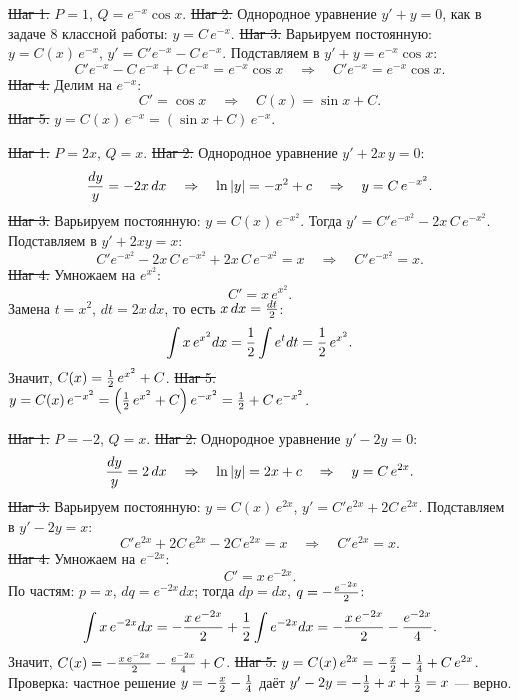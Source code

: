\st{Шаг 1.} $P=1$, $Q=e^{-x}\cos x$.
\st{Шаг 2.} Однородное уравнение $y'+y=0$, как в задаче 8 классной работы:
$y=C\,e^{-x}$.
\st{Шаг 3.} Варьируем постоянную: $y=C(x)\,e^{-x}$,
$y'=C'e^{-x}-C\,e^{-x}$. Подставляем в $y'+y=e^{-x}\cos x$:
$$C'e^{-x}-C\,e^{-x}+C\,e^{-x}=e^{-x}\cos x\quad\Rightarrow\quad
C'e^{-x}=e^{-x}\cos x.$$
\st{Шаг 4.} Делим на $e^{-x}$:
$$C'=\cos x\quad\Rightarrow\quad C(x)=\sin x+C.$$
\st{Шаг 5.} $y=C(x)\,e^{-x}=(\sin x+C)\,e^{-x}$.

\st{Шаг 1.} $P=2x$, $Q=x$.
\st{Шаг 2.} Однородное уравнение $y'+2x\,y=0$:
$${dy\over y}=-2x\,dx\quad\Rightarrow\quad\ln|y|=-x^2+c
\quad\Rightarrow\quad y=C\,e^{-x^2}.$$
\st{Шаг 3.} Варьируем постоянную: $y=C(x)\,e^{-x^2}$. Тогда
$y'=C'e^{-x^2}-2x\,C\,e^{-x^2}$. Подставляем в $y'+2xy=x$:
$$C'e^{-x^2}-2x\,C\,e^{-x^2}+2x\,C\,e^{-x^2}=x\quad\Rightarrow\quad
C'e^{-x^2}=x.$$
\st{Шаг 4.} Умножаем на $e^{x^2}$:
$$C'=x\,e^{x^2}.$$
Замена $t=x^2$, $dt=2x\,dx$, то есть $x\,dx={dt\over2}$:
$$\int x\,e^{x^2}dx={1\over2}\int e^{t}dt={1\over2}\,e^{x^2}.$$
Значит, $C(x)={1\over2}\,e^{x^2}+C$.
\st{Шаг 5.} $y=C(x)\,e^{-x^2}=\left({1\over2}\,e^{x^2}+C\right)e^{-x^2}
={1\over2}+C\,e^{-x^2}$.

\st{Шаг 1.} $P=-2$, $Q=x$.
\st{Шаг 2.} Однородное уравнение $y'-2y=0$:
$${dy\over y}=2\,dx\quad\Rightarrow\quad\ln|y|=2x+c
\quad\Rightarrow\quad y=C\,e^{2x}.$$
\st{Шаг 3.} Варьируем постоянную: $y=C(x)\,e^{2x}$,
$y'=C'e^{2x}+2C\,e^{2x}$. Подставляем в $y'-2y=x$:
$$C'e^{2x}+2C\,e^{2x}-2C\,e^{2x}=x\quad\Rightarrow\quad C'e^{2x}=x.$$
\st{Шаг 4.} Умножаем на $e^{-2x}$:
$$C'=x\,e^{-2x}.$$
По частям: $p=x$, $dq=e^{-2x}dx$; тогда $dp=dx$, $q=-{e^{-2x}\over2}$:
$$\int x\,e^{-2x}dx=-{x\,e^{-2x}\over2}+{1\over2}\int e^{-2x}dx
=-{x\,e^{-2x}\over2}-{e^{-2x}\over4}.$$
Значит, $C(x)=-{x\,e^{-2x}\over2}-{e^{-2x}\over4}+C$.
\st{Шаг 5.} $y=C(x)\,e^{2x}=-{x\over2}-{1\over4}+C\,e^{2x}$.
\smallskip
Проверка: частное решение $y=-{x\over2}-{1\over4}$ даёт
$y'-2y=-{1\over2}+x+{1\over2}=x$ --- верно.


